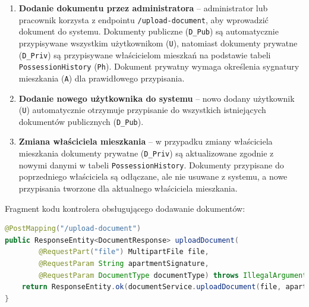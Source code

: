 \begin{enumerate}
    \item \textbf{Dodanie dokumentu przez administratora} --
    administrator lub pracownik korzysta z endpointu \texttt{/upload-document}, aby wprowadzić dokument do systemu. Dokumenty publiczne (\texttt{D\_Pub}) są automatycznie przypisywane wszystkim użytkownikom (\texttt{U}), natomiast dokumenty prywatne (\texttt{D\_Priv}) są przypisywane właścicielom mieszkań na podstawie tabeli \texttt{PossessionHistory} (\texttt{Ph}). Dokument prywatny wymaga określenia sygnatury mieszkania (\texttt{A}) dla prawidłowego przypisania.

    \item \textbf{Dodanie nowego użytkownika do systemu} --
    nowo dodany użytkownik (\texttt{U}) automatycznie otrzymuje przypisanie do wszystkich istniejących dokumentów publicznych (\texttt{D\_Pub}).

    \item \textbf{Zmiana właściciela mieszkania} --  
    w przypadku zmiany właściciela mieszkania dokumenty prywatne (\texttt{D\_Priv}) są aktualizowane zgodnie z nowymi danymi w tabeli \texttt{PossessionHistory}. Dokumenty przypisane do poprzedniego właściciela są odłączane, ale nie usuwane z systemu, a nowe przypisania tworzone dla aktualnego właściciela mieszkania.
\end{enumerate}


Fragment kodu kontrolera obsługującego dodawanie dokumentów:
\begin{lstlisting}[language=Java, style=JavaStyle, caption=Fragment klasy \texttt{DocumentController}]
@PostMapping("/upload-document")
public ResponseEntity<DocumentResponse> uploadDocument(
        @RequestPart("file") MultipartFile file,
        @RequestParam String apartmentSignature,
        @RequestParam DocumentType documentType) throws IllegalArgumentException, IOException {
    return ResponseEntity.ok(documentService.uploadDocument(file, apartmentSignature, documentType));
}
\end{lstlisting}

